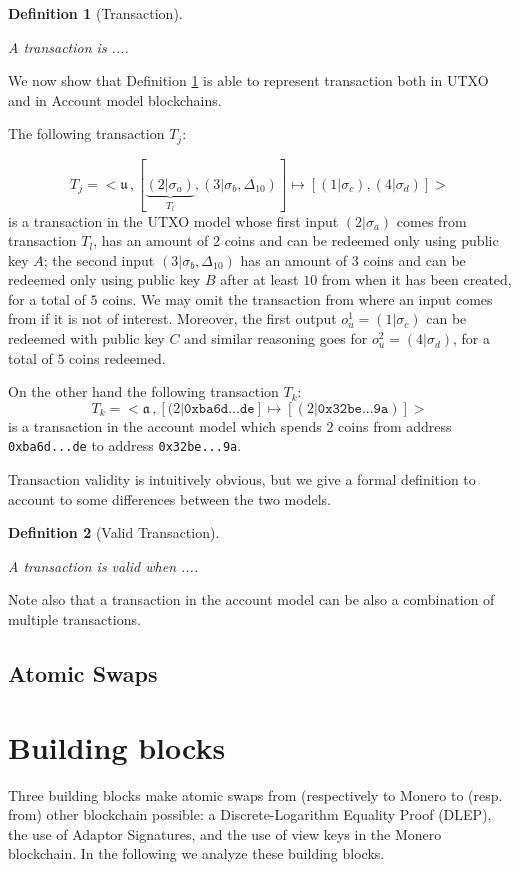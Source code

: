 \documentclass[runningheads]{llncs}
\newcommand{\tx}[3]{<\mathfrak{#1}\,, [#2]\mapsto[#3]>}
\newcommand{\curlybelow}[2]{\underbrace{#1}_{#2}}
\newtheorem{deff}{Definition}
\begin{document}
\begin{deff}[Transaction]\label{def_transaction}
    
    A transaction is ....
\end{deff}
We now show that Definition \ref{def_transaction} is able to represent transaction both in  UTXO and in  Account model blockchains.

The following transaction $T_j$:

$$
T_j = \tx u {\curlybelow{(2|\sigma_a)}{T_l},(3|\sigma_b,\Delta_{10})}{(1|\sigma_c),(4|\sigma_d)}
$$
is a transaction in the UTXO model whose first input $(2|\sigma_a)$ comes from transaction $T_l$, has an amount of $2$ coins and can be redeemed only using public key $A$; the second input $(3|\sigma_b,\Delta_{10})$ has an amount of $3$ coins and can be redeemed only using public key $B$ after at least $10$ from when it has been created, for a total of $5$ coins. We may omit the transaction from where an input comes from if it is not of interest. Moreover, the first output $o_u^1=(1|\sigma_c)$ can be redeemed with public key $C$ and similar reasoning goes for $o_u^2=(4|\sigma_d)$, for a total of $5$ coins redeemed.

On the other hand the following transaction $T_k$:
$$
T_k = \tx a {(2|\texttt{0xba6d...de}}{(2|\texttt{0x32be...9a})}
$$
is a transaction in the account model which spends $2$ coins from address \texttt{0xba6d...de} to  address \texttt{0x32be...9a}.

Transaction validity is intuitively obvious, but we give a formal definition to account to some differences between the two models.
\begin{deff}[Valid Transaction]\label{def_transaction_validity}
    
    A transaction is valid when ....
\end{deff}
Note also that a transaction in the account model can be also a combination of multiple transactions. 


\subsection{Atomic Swaps}
\label{sec_atomic_swaps}

\section{Building blocks}
Three building blocks make atomic swaps from (respectively to Monero to (resp. from) other blockchain possible: a Discrete-Logarithm Equality Proof (DLEP), the use of Adaptor Signatures, and the use of view keys in the Monero blockchain.
In the following we analyze these building blocks.
\end{document}
